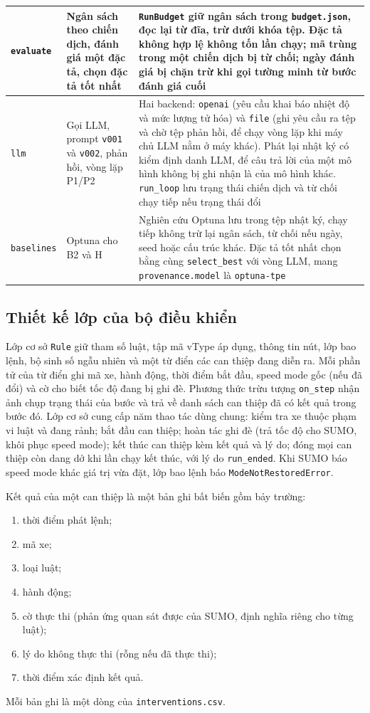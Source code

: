 \documentclass[../DoAn.tex]{subfiles}
\begin{document}
\begin{longtable}{|p{2.3cm}|p{4.2cm}|p{7.5cm}|}
\texttt{evaluate} & Ngân sách theo chiến dịch, đánh giá một đặc tả, chọn đặc tả tốt nhất & \texttt{RunBudget} giữ ngân sách trong \texttt{budget.json}, đọc lại từ đĩa, trừ dưới khóa tệp. Đặc tả không hợp lệ không tốn lần chạy; mã trùng trong một chiến dịch bị từ chối; ngày đánh giá bị chặn trừ khi gọi tường minh từ bước đánh giá cuối \\ \hline
\texttt{llm} & Gọi LLM, prompt \texttt{v001} và \texttt{v002}, phản hồi, vòng lặp P1/P2 & Hai backend: \texttt{openai} (yêu cầu khai báo nhiệt độ và mức lượng tử hóa) và \texttt{file} (ghi yêu cầu ra tệp và chờ tệp phản hồi, để chạy vòng lặp khi máy chủ LLM nằm ở máy khác). Phát lại nhật ký có kiểm định danh LLM, để câu trả lời của một mô hình không bị ghi nhận là của mô hình khác. \texttt{run\_loop} lưu trạng thái chiến dịch và từ chối chạy tiếp nếu trạng thái đổi \\ \hline
\texttt{baselines} & Optuna cho B2 và H & Nghiên cứu Optuna lưu trong tệp nhật ký, chạy tiếp không trừ lại ngân sách, từ chối nếu ngày, seed hoặc cấu trúc khác. Đặc tả tốt nhất chọn bằng cùng \texttt{select\_best} với vòng LLM, mang \texttt{provenance.model} là \texttt{optuna-tpe} \\ \hline
\end{longtable}
\endgroup

\subsection{Thiết kế lớp của bộ điều khiển}

Lớp cơ sở \texttt{Rule} giữ tham số luật, tập mã vType áp dụng, thông tin nút, lớp bao lệnh, bộ sinh số ngẫu nhiên và một từ điển các can thiệp đang diễn ra. Mỗi phần tử của từ điển ghi mã xe, hành động, thời điểm bắt đầu, speed mode gốc (nếu đã đổi) và cờ cho biết tốc độ đang bị ghi đè. Phương thức trừu tượng \texttt{on\_step} nhận ảnh chụp trạng thái của bước và trả về danh sách can thiệp đã có kết quả trong bước đó. Lớp cơ sở cung cấp năm thao tác dùng chung: kiểm tra xe thuộc phạm vi luật và đang rảnh; bắt đầu can thiệp; hoàn tác ghi đè (trả tốc độ cho SUMO, khôi phục speed mode); kết thúc can thiệp kèm kết quả và lý do; đóng mọi can thiệp còn dang dở khi lần chạy kết thúc, với lý do \texttt{run\_ended}. Khi SUMO báo speed mode khác giá trị vừa đặt, lớp bao lệnh báo \texttt{ModeNotRestoredError}.

Kết quả của một can thiệp là một bản ghi bất biến gồm bảy trường:
\begin{enumerate}[label=(\arabic*)]
    \item thời điểm phát lệnh;
    \item mã xe;
    \item loại luật;
    \item hành động;
    \item cờ thực thi (phản ứng quan sát được của SUMO, định nghĩa riêng cho từng luật);
    \item lý do không thực thi (rỗng nếu đã thực thi);
    \item thời điểm xác định kết quả.
\end{enumerate}
Mỗi bản ghi là một dòng của \texttt{interventions.csv}.
\end{document}
